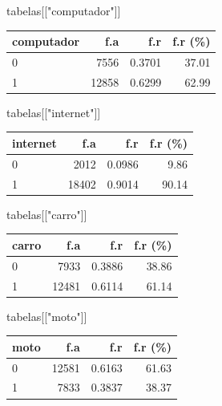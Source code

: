 \documentclass[
]{article}
\newenvironment{Shaded}{\begin{snugshade}}{\end{snugshade}}
\newcommand{\NormalTok}[1]{\textcolor[rgb]{0.00,0.23,0.31}{#1}}
\newcommand{\StringTok}[1]{\textcolor[rgb]{0.13,0.47,0.30}{#1}}
\begin{document}
\begin{Shaded}
\begin{Highlighting}[]
\NormalTok{tabelas[[}\StringTok{"computador"}\NormalTok{]]}
\end{Highlighting}
\end{Shaded}

\begin{longtable}[]{@{}lrrr@{}}
\toprule()
computador & f.a & f.r & f.r (\%) \\
\midrule()
\endhead
0 & 7556 & 0.3701 & 37.01 \\
1 & 12858 & 0.6299 & 62.99 \\
\bottomrule()
\end{longtable}

\begin{Shaded}
\begin{Highlighting}[]
\NormalTok{tabelas[[}\StringTok{"internet"}\NormalTok{]]}
\end{Highlighting}
\end{Shaded}

\begin{longtable}[]{@{}lrrr@{}}
\toprule()
internet & f.a & f.r & f.r (\%) \\
\midrule()
\endhead
0 & 2012 & 0.0986 & 9.86 \\
1 & 18402 & 0.9014 & 90.14 \\
\bottomrule()
\end{longtable}

\begin{Shaded}
\begin{Highlighting}[]
\NormalTok{tabelas[[}\StringTok{"carro"}\NormalTok{]]}
\end{Highlighting}
\end{Shaded}

\begin{longtable}[]{@{}lrrr@{}}
\toprule()
carro & f.a & f.r & f.r (\%) \\
\midrule()
\endhead
0 & 7933 & 0.3886 & 38.86 \\
1 & 12481 & 0.6114 & 61.14 \\
\bottomrule()
\end{longtable}

\begin{Shaded}
\begin{Highlighting}[]
\NormalTok{tabelas[[}\StringTok{"moto"}\NormalTok{]]}
\end{Highlighting}
\end{Shaded}

\begin{longtable}[]{@{}lrrr@{}}
\toprule()
moto & f.a & f.r & f.r (\%) \\
\midrule()
\endhead
0 & 12581 & 0.6163 & 61.63 \\
1 & 7833 & 0.3837 & 38.37 \\
\bottomrule()
\end{longtable}
\end{document}
